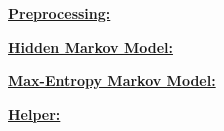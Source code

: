 \documentclass[11pt]{article}
\begin{document}
\begin{appendices}
\textbf{\huge\underline{Preprocessing:}}


\textbf{\huge\underline{Hidden Markov Model:}}


\textbf{\huge\underline{Max-Entropy Markov Model:}}


\textbf{\huge\underline{Helper:}}

\end{appendices}
\end{document}

